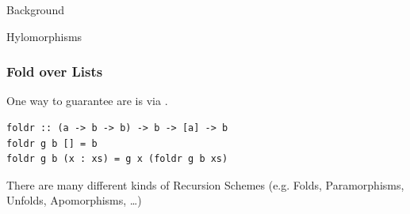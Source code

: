 
\begin{frame}
  \vfill
  \centering
  \begin{sticky}
    {\normalfont Background}

    {\normalfont\Large Hylomorphisms}
    \par%
  \end{sticky}
  \vfill
\end{frame}

\begin{frame}[fragile]
  \frametitle{Fold over Lists}

  One way to guarantee  are  is
  via .

  \vspace{.6cm}

  \begin{verbatim}
foldr :: (a -> b -> b) -> b -> [a] -> b
foldr g b [] = b
foldr g b (x : xs) = g x (foldr g b xs)
  \end{verbatim}

  \vspace{.6cm}

  There are many different kinds of Recursion Schemes (e.g. Folds,
  Paramorphisms, Unfolds, Apomorphisms, \ldots)
\end{frame}

